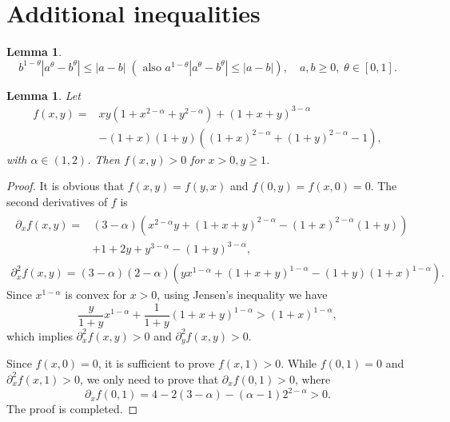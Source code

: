 \documentclass{amsart}
\newtheorem{lemma}[theorem]{Lemma}
\theoremstyle{definition}
\theoremstyle{remark}
\numberwithin{equation}{section}
\begin{document}
\section{Additional inequalities}

\begin{lemma} \label{ineq:a-b-theta}
  \begin{equation*}
    b^{1-\theta}|a^{\theta}-b^{\theta}| \le |a-b| \; (\text{  also  }a^{1-\theta}|a^{\theta}-b^{\theta}| \le |a-b|), \quad a,b\ge 0,\; \theta \in [0,1] .
  \end{equation*}
\end{lemma}


\begin{lemma} \label{eq:ineq_fxy}
    Let 
    \begin{equation*}
        \begin{aligned}
    f(x,y) =& xy(1+x^{2-\alpha} +y^{2-\alpha}) + (1+x+y)^{3-\alpha} \\
         &- (1+x)(1+y)\left( (1+x)^{2-\alpha} + (1+y)^{2-\alpha} - 1 \right) ,
        \end{aligned}
    \end{equation*}
    with $\alpha \in (1,2)$. Then $f(x,y) > 0$ for $x > 0, y\ge 1$.
\end{lemma}
\begin{proof}
    It is obvious that $f(x,y)=f(y,x)$ and $f(0, y) = f(x, 0) = 0$. The second derivatives of $f$ is
    \begin{gather*}
        \begin{aligned}
        \partial_x f(x,y) =&  
            (3-\alpha)\left( x^{2-\alpha} y + (1+x+y)^{2-\alpha} - (1+x)^{2-\alpha}(1+y) \right) \\
            &+ 1+2y+y^{3-\alpha}-(1+y)^{3-\alpha} ,
        \end{aligned}  \\
        \partial_x^2 f(x, y) = (3-\alpha)(2-\alpha) \left( y x^{1-\alpha} + (1+x+y)^{1-\alpha} - (1+y) (1+x)^{1-\alpha} \right).
    \end{gather*}
    Since $x^{1-\alpha}$ is convex for $x>0$, using Jensen's inequality we have
    \begin{equation*}
        \frac{y}{1+y} x^{1-\alpha} + \frac{1}{1+y} (1+x+y)^{1-\alpha} > (1+x)^{1-\alpha},
    \end{equation*}
    which implies $\partial_x^2 f(x, y) > 0$ and $\partial_y^2 f(x, y) > 0$.
    
    Since $f(x, 0) = 0$, it is sufficient to prove $f(x,1) > 0$. 
    While $f(0, 1) = 0$ and $\partial_x^2 f(x, 1) > 0$, we only need to prove that $\partial_x f(0, 1) > 0$, where
    \begin{equation*}
        \partial_x f(0, 1) = 4 - 2(3-\alpha) - (\alpha-1) 2^{2-\alpha} > 0.
    \end{equation*}
    The proof is completed.
\end{proof}







\end{document}
